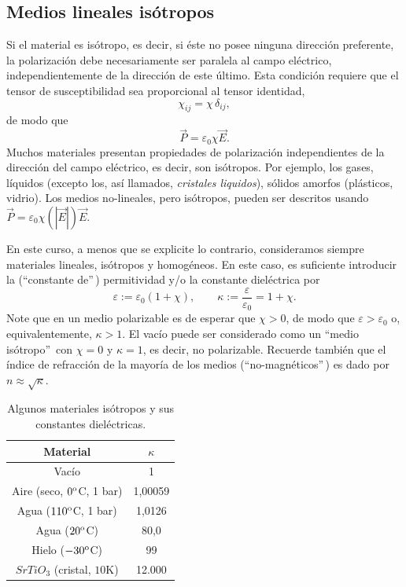 \subsection{Medios lineales isótropos}\label{sec:iso}
Si el material es isótropo, es decir, si éste no posee ninguna dirección
preferente, la polarización debe necesariamente ser paralela al campo
eléctrico, independientemente de la dirección de este último. Esta condición requiere que el tensor de susceptibilidad sea proporcional al tensor identidad,
\begin{equation}
\chi_{ij}=\chi\,\delta_{ij},
\end{equation}
de modo que
\begin{equation}
\vec{P}=\varepsilon_0\chi\vec{E}.
\end{equation}
Muchos materiales presentan propiedades de polarización independientes de
la dirección del campo eléctrico, es decir, son isótropos. Por ejemplo, los
gases, líquidos (excepto los, así llamados, \textit{cristales liquidos}), sólidos amorfos (plásticos, vidrio).
Los medios no-lineales, pero isótropos, pueden ser descritos usando
$\vec{P}=\varepsilon_0\chi(|\vec{E}|)\vec{E}$.

En este curso, a menos que se explicite lo contrario, consideramos siempre
materiales lineales, isótropos y homogéneos. En este caso, es suficiente
introducir la (``constante de''\,) permitividad y/o la constante dieléctrica
por
\begin{equation}
\varepsilon:=\varepsilon_0(1+\chi), \qquad
\kappa:=\frac{\varepsilon}{\varepsilon_0}=1+\chi.
\end{equation}
Note que en un medio polarizable es de esperar que $\chi>0$, de modo que
$\varepsilon>\varepsilon_0$ o, equivalentemente, $\kappa>1$. El vacío puede ser
considerado como un ``medio isótropo''\, con $\chi=0$ y $\kappa=1$, es decir, no polarizable.
Recuerde también que el índice de refracción de la mayoría de los medios
(``no-magnéticos''\,) es dado por $n\approx\sqrt{\kappa}$.
\begin{table}[!h]
\begin{center}
\begin{tabular}{c|c}
Material &   $\kappa$ \\ \hline\hline
Vacío & 1 \\
Aire (seco, $0^{\rm o}$C, 1 bar)  & 1,00059 \\
Agua ($110^{\rm o}$C, 1 bar)  & 1,0126 \\
Agua ($20^{\rm o}$C) &  80,0 \\
Hielo ($-30^{\rm o}$C) &  99 \\
$SrTiO_3$ (cristal, $10$K)  & 12.000 \\
\end{tabular}
\caption{Algunos materiales isótropos y sus constantes dieléctricas.}
\end{center}
\end{table}

